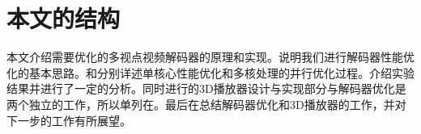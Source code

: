 \section{本文的结构}
\label{sec:thesisstructure}

本文介绍需要优化的多视点视频解码器的原理和实现。说明我们进行解码器性能优化的基本思路。和分别详述单核心性能优化和多核处理的并行优化过程。介绍实验结果并进行了一定的分析。同时进行的3D播放器设计与实现部分与解码器优化是两个独立的工作，所以单列在。最后在总结解码器优化和3D播放器的工作，并对下一步的工作有所展望。

\cleardoublepage